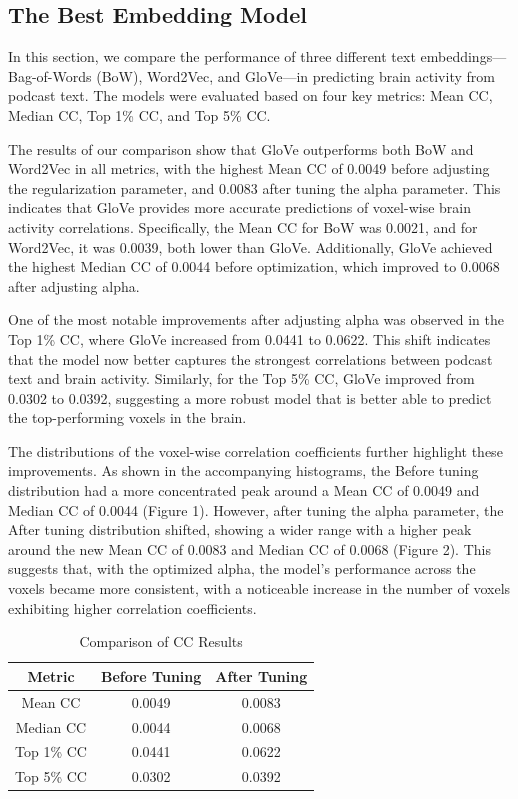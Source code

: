 \documentclass[11pt,letterpaper]{article}
\begin{document}
\vspace{1em} %
\subsection{The Best Embedding Model}
\vspace{0.5em} %

In this section, we compare the performance of three different text embeddings—Bag-of-Words (BoW), Word2Vec, and GloVe—in predicting brain activity from podcast text. The models were evaluated based on four key metrics: Mean CC, Median CC, Top 1\% CC, and Top 5\% CC.

The results of our comparison show that GloVe outperforms both BoW and Word2Vec in all metrics, with the highest Mean CC of 0.0049 before adjusting the regularization parameter, and 0.0083 after tuning the alpha parameter. This indicates that GloVe provides more accurate predictions of voxel-wise brain activity correlations. Specifically, the Mean CC for BoW was 0.0021, and for Word2Vec, it was 0.0039, both lower than GloVe. Additionally, GloVe achieved the highest Median CC of 0.0044 before optimization, which improved to 0.0068 after adjusting alpha.

One of the most notable improvements after adjusting alpha was observed in the Top 1\% CC, where GloVe increased from 0.0441 to 0.0622. This shift indicates that the model now better captures the strongest correlations between podcast text and brain activity. Similarly, for the Top 5\% CC, GloVe improved from 0.0302 to 0.0392, suggesting a more robust model that is better able to predict the top-performing voxels in the brain.

The distributions of the voxel-wise correlation coefficients further highlight these improvements. As shown in the accompanying histograms, the Before tuning distribution had a more concentrated peak around a Mean CC of 0.0049 and Median CC of 0.0044 (Figure 1). However, after tuning the alpha parameter, the After tuning distribution shifted, showing a wider range with a higher peak around the new Mean CC of 0.0083 and Median CC of 0.0068 (Figure 2). This suggests that, with the optimized alpha, the model's performance across the voxels became more consistent, with a noticeable increase in the number of voxels exhibiting higher correlation coefficients.

\begin{table}[ht]
\centering
\begin{tabular}{|c|c|c|}
\hline
\textbf{Metric} & \textbf{Before Tuning} & \textbf{After Tuning} \\
\hline
Mean CC & 0.0049 & 0.0083 \\
\hline
Median CC & 0.0044 & 0.0068 \\
\hline
Top 1\% CC & 0.0441 & 0.0622 \\
\hline
Top 5\% CC & 0.0302 & 0.0392 \\
\hline
\end{tabular}
\caption{Comparison of CC Results}
\end{table}
\end{document}
